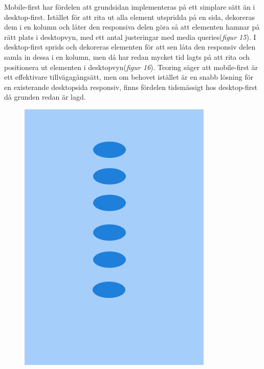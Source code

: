 \documentclass[11pt]{article}
\begin{document}
Mobile-first har fördelen att grundsidan implementeras på ett simplare sätt än i desktop-first. Istället för att rita ut alla element utspridda på en sida, dekoreras dem i en kolumn och låter den responsiva delen göra så att elementen hamnar på rätt plats i desktopvyn, med ett antal justeringar med media queries(\textit{figur 15}). I desktop-first sprids och dekoreras elementen för att sen låta den responsiv delen samla in dessa i en kolumn, men då har redan mycket tid lagts på att rita och positionera ut elementen i desktopvyn(\textit{figur 16}). Teoring säger att mobile-first är ett effektivare tillvägagångsätt, men om behovet istället är en snabb lösning för en existerande desktopsida responsiv, finns fördelen tidsmässigt hos desktop-first då grunden redan är lagd.
\\
\begin{figure}[H]
\centerline{%
\includegraphics[scale=0.27]{pics/mobiledots.png}\hspace{2em}%
}
\end{figure}
\end{document}
